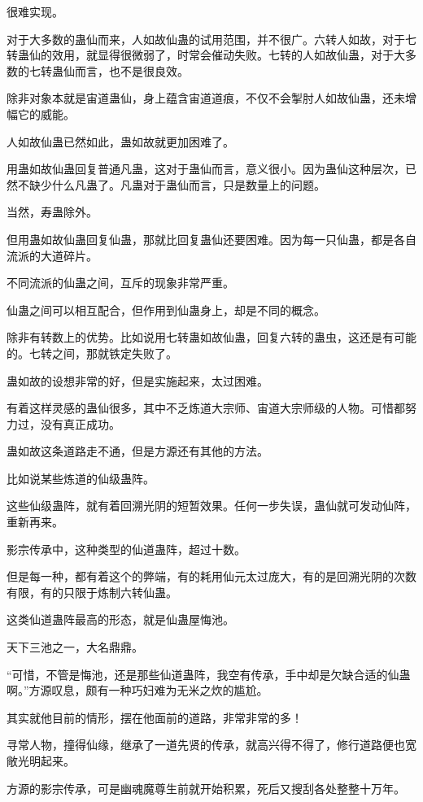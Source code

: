 \begin{this_body}
很难实现。

对于大多数的蛊仙而来，人如故仙蛊的试用范围，并不很广。六转人如故，对于七转蛊仙的效用，就显得很微弱了，时常会催动失败。七转的人如故仙蛊，对于大多数的七转蛊仙而言，也不是很良效。

除非对象本就是宙道蛊仙，身上蕴含宙道道痕，不仅不会掣肘人如故仙蛊，还未增幅它的威能。

人如故仙蛊已然如此，蛊如故就更加困难了。

用蛊如故仙蛊回复普通凡蛊，这对于蛊仙而言，意义很小。因为蛊仙这种层次，已然不缺少什么凡蛊了。凡蛊对于蛊仙而言，只是数量上的问题。

当然，寿蛊除外。

但用蛊如故仙蛊回复仙蛊，那就比回复蛊仙还要困难。因为每一只仙蛊，都是各自流派的大道碎片。

不同流派的仙蛊之间，互斥的现象非常严重。

仙蛊之间可以相互配合，但作用到仙蛊身上，却是不同的概念。

除非有转数上的优势。比如说用七转蛊如故仙蛊，回复六转的蛊虫，这还是有可能的。七转之间，那就铁定失败了。

蛊如故的设想非常的好，但是实施起来，太过困难。

有着这样灵感的蛊仙很多，其中不乏炼道大宗师、宙道大宗师级的人物。可惜都努力过，没有真正成功。

蛊如故这条道路走不通，但是方源还有其他的方法。

比如说某些炼道的仙级蛊阵。

这些仙级蛊阵，就有着回溯光阴的短暂效果。任何一步失误，蛊仙就可发动仙阵，重新再来。

影宗传承中，这种类型的仙道蛊阵，超过十数。

但是每一种，都有着这个的弊端，有的耗用仙元太过庞大，有的是回溯光阴的次数有限，有的只限于炼制六转仙蛊。

这类仙道蛊阵最高的形态，就是仙蛊屋悔池。

天下三池之一，大名鼎鼎。

“可惜，不管是悔池，还是那些仙道蛊阵，我空有传承，手中却是欠缺合适的仙蛊啊。”方源叹息，颇有一种巧妇难为无米之炊的尴尬。

其实就他目前的情形，摆在他面前的道路，非常非常的多！

寻常人物，撞得仙缘，继承了一道先贤的传承，就高兴得不得了，修行道路便也宽敞光明起来。

方源的影宗传承，可是幽魂魔尊生前就开始积累，死后又搜刮各处整整十万年。


\end{this_body}
